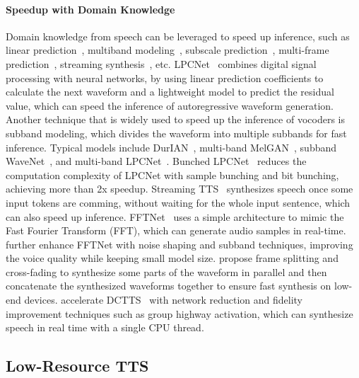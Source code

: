 \documentclass{article}
\begin{document}
\paragraph{Speedup with Domain Knowledge}
Domain knowledge from speech can be leveraged to speed up inference, such as linear prediction~\cite{valin2019lpcnet}, multiband modeling~\cite{yu2020durian,yang2020multi,cui2020efficient}, subscale prediction~\cite{kalchbrenner2018efficient}, multi-frame prediction~\cite{zen2016fast,wang2017tacotron,wangfcl,huang2020devicetts,liu2021fasttalker}, streaming synthesis~\cite{ellinas2020high}, etc. LPCNet~\cite{valin2019lpcnet} combines digital signal processing with neural networks, by using linear prediction coefficients to calculate the next waveform and a lightweight model to predict the residual value, which can speed the inference of autoregressive waveform generation. Another technique that is widely used to speed up the inference of vocoders is subband modeling, which divides the waveform into multiple subbands for fast inference. Typical models include DurIAN~\cite{yu2020durian}, multi-band MelGAN~\cite{yang2020multi}, subband WaveNet~\cite{okamoto2018investigation}, and multi-band LPCNet~\cite{tian2020featherwave,cui2020efficient}. Bunched LPCNet~\cite{vipperla2020bunched} reduces the computation complexity of LPCNet with sample bunching and bit bunching, achieving more than 2x speedup. Streaming TTS~\cite{ellinas2020high,ma2020incremental,stephenson2020future,yanagita2019neural,stephenson2021alternate,mohan2020incremental} synthesizes speech once some input tokens are comming, without waiting for the whole input sentence, which can also speed up inference. FFTNet~\cite{jin2018fftnet} uses a simple architecture to mimic the Fast Fourier Transform (FFT), which can generate audio samples in real-time. \citet{okamoto2018improving} further enhance FFTNet with noise shaping and subband techniques, improving the voice quality while keeping small model size. \citet{popov2020fast} propose frame splitting and cross-fading to synthesize some parts of the waveform in parallel and then concatenate the synthesized waveforms together to ensure fast synthesis on low-end devices. \citet{kang2021fast} accelerate DCTTS~\cite{tachibana2018efficiently} with network reduction and fidelity improvement techniques such as group highway activation, which can synthesize speech in real time with a single CPU thread.


\subsection{Low-Resource TTS}
\label{sec_advance_low}
\end{document}
